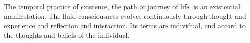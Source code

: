 

The temporal practice of existence, the path or journey of life, is an
existential manifestation.  The fluid consciousness evolves
continuously through thought and experience and reflection and
interaction.  Its terms are individual, and accord to the thoughts and
beliefs of the individual.

\bye
